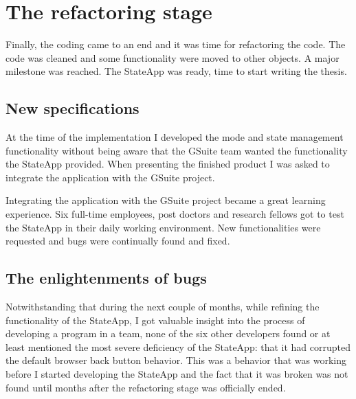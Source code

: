\documentclass[english]{ifimaster}
\begin{document}
\section{The refactoring stage}
Finally, the coding came to an end and it was time for refactoring the code. The code was cleaned and some functionality were moved to other objects. A major milestone was reached. The StateApp was ready, time to start writing the thesis.

\subsection{New specifications}
At the time of the implementation I developed the mode and state management functionality without being aware that the GSuite team wanted the functionality the StateApp provided. When presenting the finished product I was asked to integrate the application with the GSuite project.  

Integrating the application with the GSuite project became a great learning experience. Six full-time employees, post doctors and research fellows got to test the StateApp in their daily working environment. New functionalities were requested and bugs were continually found and fixed.



\subsection{The enlightenments of bugs}
Notwithstanding that during the next couple of months, while refining the functionality of the StateApp, I got valuable insight into the process of developing a program in a team, none of the six other developers found or at least mentioned the most severe deficiency of the StateApp: that it had corrupted the default browser back button behavior. This was a behavior that was working before I started developing the StateApp and the fact that it was broken was not found until months after the refactoring stage was officially ended. 
\end{document}
